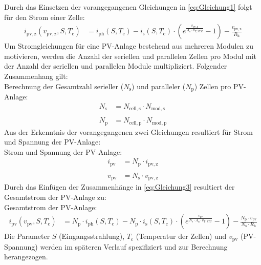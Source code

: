 \newline
Durch das Einsetzen der vorangegangenen Gleichungen in \autoref{eq:Gleichung1} folgt für den Strom einer Zelle:
\begin{align}
    i_{\mathrm{pv,z}}(v_{\mathrm{pv,z}}, S, T_{\mathrm{c}}) &= i_{\mathrm{ph}}(S, T_{\mathrm{c}})-i_{\mathrm{s}}(S, T_{\mathrm{c}})\cdot\left(e^{\frac{v_{\mathrm{pv,z}}}{A_{\mathrm{n}}\cdot v_{\mathrm{T,STC}}}}-1\right)-\frac{v_{\mathrm{pv,z}}}{R_{\mathrm{h}}}
    \label{eq:Gleichung3}
\end{align}
\newline
Um Stromgleichungen für eine PV-Anlage bestehend aus mehreren Modulen zu motivieren, werden die Anzahl der seriellen und parallelen Zellen pro Modul mit der Anzahl der seriellen und parallelen Module multipliziert. Folgender Zusammenhang gilt:\\
\newline
Berechnung der Gesamtzahl serieller ($N_{\mathrm{s}}$) und paralleler ($N_{\mathrm{p}}$) Zellen pro PV-Anlage:
\begin{align*}
    N_{\mathrm{s}} &= N_{\mathrm{cell,s}}\cdot N_{\mathrm{mod,s}} \\ \nonumber \\
    N_{\mathrm{p}} &= N_{\mathrm{cell,p}}\cdot N_{\mathrm{mod,p}}
\end{align*}
\newline
Aus der Erkenntnis der vorangegangenen zwei Gleichungen resultiert für Strom und Spannung der PV-Anlage:\\
\newline
Strom und Spannung der PV-Anlage:
\begin{align*}
    i_{\mathrm{pv}} &= N_{\mathrm{p}}\cdot i_{\mathrm{pv,z}} \\ \nonumber \\
    v_{\mathrm{pv}} &= N_{\mathrm{s}}\cdot v_{\mathrm{pv,z}}
\end{align*}
\newline
Durch das Einfügen der Zusammenhänge in \autoref{eq:Gleichung3} resultiert der Gesamtstrom der PV-Anlage zu:\\
\newline
Gesamtstrom der PV-Anlage:
\begin{align}
    i_{\mathrm{pv}}(v_{\mathrm{pv}}, S, T_{\mathrm{c}}) &= N_{\mathrm{p}}\cdot i_{\mathrm{ph}}(S, T_{\mathrm{c}})-N_{\mathrm{p}}\cdot i_{\mathrm{s}}(S, T_{\mathrm{c}})\cdot\left(e^{\frac{v_{\mathrm{pv}}}{N_{\mathrm{s}}\cdot A_{\mathrm{n}}\cdot v_{\mathrm{T,STC}}}}-1\right)-\frac{N_{\mathrm{p}}\cdot v_{\mathrm{pv}}}{N_{\mathrm{s}}\cdot R_{\mathrm{h}}}
    \label{eq:Gleichung4}
\end{align}
\newline
Die Parameter $S$ (Eingangsstrahlung), $T_{\mathrm{c}}$ (Temperatur der Zellen) und $v_{\mathrm{pv}}$ (PV-Spannung) werden im späteren Verlauf spezifiziert und zur Berechnung herangezogen.


